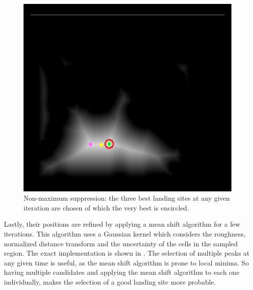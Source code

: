 \begin{figure}[ht!]
    \centering
    \includegraphics[scale=0.5]{images/system_overview/non_max_suppression.png}
    \caption{Non-maximum suppression: the three best landing sites at any given iteration are chosen of which the very best is encircled.}
    \label{fig:non_max_sup}
\end{figure}

Lastly, their positions are refined by applying a mean shift algorithm for a few iterations. This algorithm uses a Gaussian kernel which considers the roughness, normalized distance transform and the uncertainty of the cells in the sampled region. The exact implementation is shown in \citet{LSD2}. The selection of multiple peaks at any given time is useful, as the mean shift algorithm is prone to local minima. So having multiple candidates and applying the mean shift algorithm to each one individually, makes the selection of a good landing site more probable.

